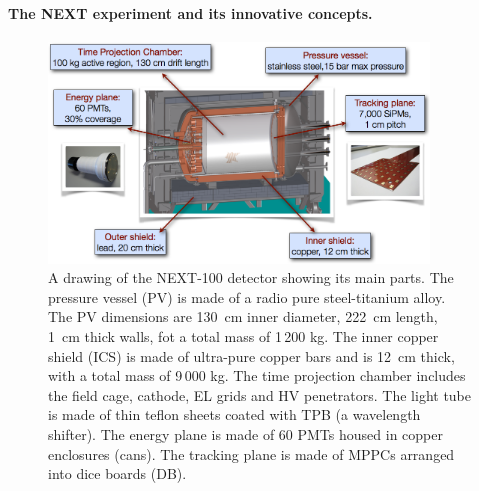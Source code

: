 % 
 
\paragraph{The NEXT experiment and its innovative concepts.}
\begin{figure}
\centering
\includegraphics[width=0.9\textwidth]{img/NEXT.png}
\caption{\small A drawing of the NEXT-100 detector showing its main parts. The pressure vessel (PV) is made of a radio pure steel-titanium alloy. The PV dimensions are 130~cm inner diameter, 222~cm length, 1~cm thick walls, fot a total mass of 1\,200 kg. The inner copper shield (ICS) is made of ultra-pure copper bars and is 12~cm thick, with a total mass of 9\,000 kg. The time projection chamber includes the field cage, cathode, EL grids and HV penetrators.
The light tube is made of thin teflon sheets coated with TPB (a wavelength shifter). 
The energy plane is made of 60 PMTs housed in copper enclosures (cans).
The tracking plane is made of MPPCs arranged into dice boards (DB). 
} \label{fig.NEXT100}
\end{figure}

